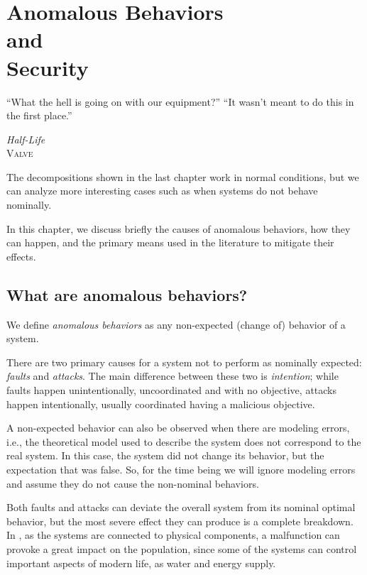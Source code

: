 \documentclass[../main.tex]{subfiles}
\begin{document}
\chapter[Anomalous Behaviors \& Security]{Anomalous Behaviors\\and\\ Security}\label{sec:anomalous}


\epigraph{``What the hell is going on with our equipment?''
``It wasn't meant to do this in the first place.''}
{\textit{Half-Life}\\\textsc{Valve}}

The decompositions shown in the last chapter work in normal conditions, but we can analyze more interesting cases such as when systems do not behave nominally.

In this chapter, we discuss briefly the causes of anomalous behaviors, how they can happen, and the primary means used in the literature to mitigate their effects.

\minitoc%

\section{What are anomalous behaviors?}
We define \emph{anomalous behaviors} as any non-expected (change of) behavior of a system.

There are two primary causes for a system not to perform as nominally expected: \emph{faults} and \emph{attacks}.
The main difference between these two is \emph{intention}; while faults happen unintentionally, uncoordinated and with no objective, attacks happen intentionally, usually coordinated having a malicious objective.

\begin{remark}
  A non-expected behavior can also be observed when there are modeling errors, i.e., the theoretical model used to describe the system does not correspond to the real system.
  In this case, the system did not change its behavior, but the expectation that was false.
  So, for the time being we will ignore modeling errors and assume they do not cause the non-nominal behaviors.
\end{remark}

Both faults and attacks can deviate the overall system from its nominal optimal behavior, but the most severe effect they can produce is a complete breakdown.
In \cps{}, as the systems are connected to physical components, a malfunction can provoke a great impact on the population, since some of the systems can control important
aspects of modern life, as water and energy supply.
\end{document}
